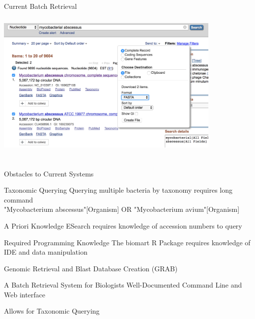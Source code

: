 \documentclass[11pt]{beamer}
\begin{document}
	\begin{frame}{Current Batch Retrieval} 
	\vspace{-1cm}
	\center
	\includegraphics[height=8cm, width=11cm]{Download.png}
	\end{frame}
	
	\begin{frame}{Obstacles to Current Systems}
	\begin{block}{Taxonomic Querying}
	Querying multiple bacteria by taxonomy requires long command \\
	\vspace{0.5cm}
	\tiny{"Mycobacterium abscessus"[Organism] OR "Mycobacterium avium"[Organism]}
	\end{block}
	
	\begin{block}{A Priori Knowledge}
	ESearch requires knowledge of accession numbers to query
	\end{block}
	
	\begin{block}{Required Programming Knowledge}
	The biomart R Package requires knowledge of IDE and data manipulation
	\end{block}
	\end{frame}
	
	\begin{frame}{Genomic Retrieval and Blast Database Creation (GRAB)}
	\begin{block}{A Batch Retrieval System for Biologists}
	Well-Documented Command Line and Web interface
	\end{block}
	
	\begin{block}{Allows for Taxonomic Querying}
	\end{block}
	
	
	
	\end{frame}
	
\end{document}
